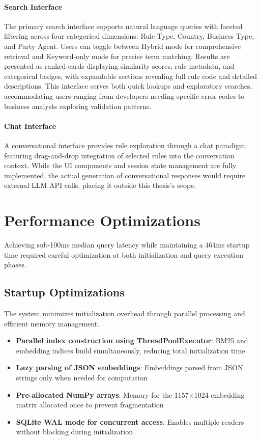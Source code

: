 \paragraph{Search Interface} 
The primary search interface supports natural language queries with faceted filtering across four categorical dimensions: Rule Type, Country, Business Type, and Party Agent. Users can toggle between Hybrid mode for comprehensive retrieval and Keyword-only mode for precise term matching. Results are presented as ranked cards displaying similarity scores, rule metadata, and categorical badges, with expandable sections revealing full rule code and detailed descriptions. This interface serves both quick lookups and exploratory searches, accommodating users ranging from developers needing specific error codes to business analysts exploring validation patterns.

\paragraph{Chat Interface}
A conversational interface provides rule exploration through a chat paradigm, featuring drag-and-drop integration of selected rules into the conversation context. While the UI components and session state management are fully implemented, the actual generation of conversational responses would require external LLM API calls, placing it outside this thesis's scope.

\section{Performance Optimizations}

Achieving sub-100ms median query latency while maintaining a 464ms startup time required careful optimization at both initialization and query execution phases.

\subsection{Startup Optimizations}

The system minimizes initialization overhead through parallel processing and efficient memory management.

\begin{itemize}[leftmargin=*,itemsep=3pt,topsep=3pt]
  \item \textbf{Parallel index construction using ThreadPoolExecutor}: BM25 and embedding indices build simultaneously, reducing total initialization time
  \item \textbf{Lazy parsing of JSON embeddings}: Embeddings parsed from JSON strings only when needed for computation
  \item \textbf{Pre-allocated NumPy arrays}: Memory for the 1157×1024 embedding matrix allocated once to prevent fragmentation
  \item \textbf{SQLite WAL mode for concurrent access}: Enables multiple readers without blocking during initialization
\end{itemize}

